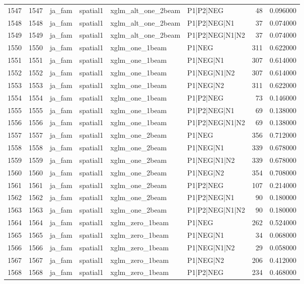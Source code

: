 \begin{tabular}{lrllllrr}
1547 & 1547 & ja_fam & spatial1 & xglm_alt_one_2beam & P1|P2|NEG & 48 & 0.096000 \\
1548 & 1548 & ja_fam & spatial1 & xglm_alt_one_2beam & P1|P2|NEG|N1 & 37 & 0.074000 \\
1549 & 1549 & ja_fam & spatial1 & xglm_alt_one_2beam & P1|P2|NEG|N1|N2 & 37 & 0.074000 \\
1550 & 1550 & ja_fam & spatial1 & xglm_one_1beam & P1|NEG & 311 & 0.622000 \\
1551 & 1551 & ja_fam & spatial1 & xglm_one_1beam & P1|NEG|N1 & 307 & 0.614000 \\
1552 & 1552 & ja_fam & spatial1 & xglm_one_1beam & P1|NEG|N1|N2 & 307 & 0.614000 \\
1553 & 1553 & ja_fam & spatial1 & xglm_one_1beam & P1|NEG|N2 & 311 & 0.622000 \\
1554 & 1554 & ja_fam & spatial1 & xglm_one_1beam & P1|P2|NEG & 73 & 0.146000 \\
1555 & 1555 & ja_fam & spatial1 & xglm_one_1beam & P1|P2|NEG|N1 & 69 & 0.138000 \\
1556 & 1556 & ja_fam & spatial1 & xglm_one_1beam & P1|P2|NEG|N1|N2 & 69 & 0.138000 \\
1557 & 1557 & ja_fam & spatial1 & xglm_one_2beam & P1|NEG & 356 & 0.712000 \\
1558 & 1558 & ja_fam & spatial1 & xglm_one_2beam & P1|NEG|N1 & 339 & 0.678000 \\
1559 & 1559 & ja_fam & spatial1 & xglm_one_2beam & P1|NEG|N1|N2 & 339 & 0.678000 \\
1560 & 1560 & ja_fam & spatial1 & xglm_one_2beam & P1|NEG|N2 & 354 & 0.708000 \\
1561 & 1561 & ja_fam & spatial1 & xglm_one_2beam & P1|P2|NEG & 107 & 0.214000 \\
1562 & 1562 & ja_fam & spatial1 & xglm_one_2beam & P1|P2|NEG|N1 & 90 & 0.180000 \\
1563 & 1563 & ja_fam & spatial1 & xglm_one_2beam & P1|P2|NEG|N1|N2 & 90 & 0.180000 \\
1564 & 1564 & ja_fam & spatial1 & xglm_zero_1beam & P1|NEG & 262 & 0.524000 \\
1565 & 1565 & ja_fam & spatial1 & xglm_zero_1beam & P1|NEG|N1 & 34 & 0.068000 \\
1566 & 1566 & ja_fam & spatial1 & xglm_zero_1beam & P1|NEG|N1|N2 & 29 & 0.058000 \\
1567 & 1567 & ja_fam & spatial1 & xglm_zero_1beam & P1|NEG|N2 & 206 & 0.412000 \\
1568 & 1568 & ja_fam & spatial1 & xglm_zero_1beam & P1|P2|NEG & 234 & 0.468000 \\

\end{tabular}
